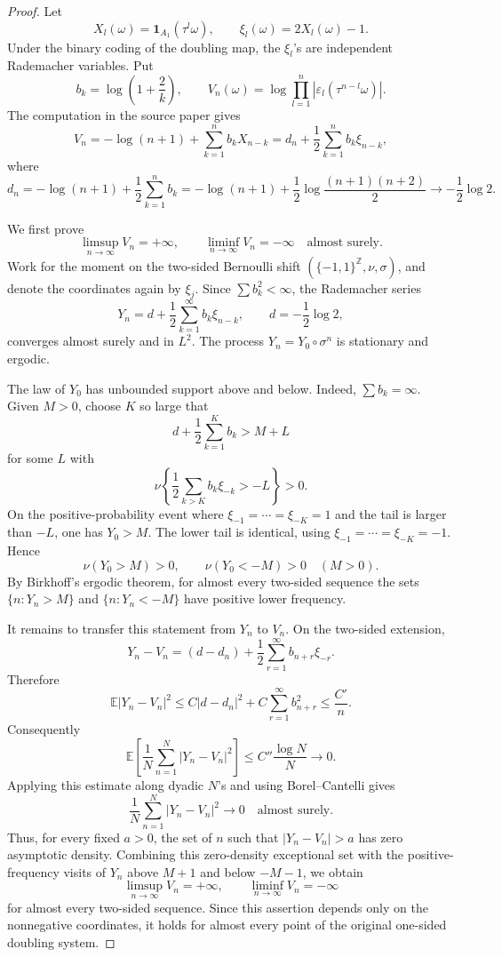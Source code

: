 \documentclass[11pt]{article}
\newcommand{\E}{\mathbb E}
\newcommand{\one}{\mathbf 1}
\begin{document}
\begin{proof}
Let
\[
  X_l(\omega)=\one_{A_1}(\tau^l\omega), \qquad
  \xi_l(\omega)=2X_l(\omega)-1 .
\]
Under the binary coding of the doubling map, the \(\xi_l\)'s are independent
Rademacher variables.  Put
\[
  b_k=\log\left(1+\frac2k\right), \qquad
  V_n(\omega)=
  \log\prod_{l=1}^{n}
  \left|\varepsilon_l(\tau^{n-l}\omega)\right|.
\]
The computation in the source paper gives
\[
  V_n
  =
  -\log(n+1)+\sum_{k=1}^{n} b_k X_{n-k}
  =
  d_n+\frac12\sum_{k=1}^{n} b_k \xi_{n-k},
\]
where
\[
  d_n=-\log(n+1)+\frac12\sum_{k=1}^{n} b_k
      =-\log(n+1)+\frac12\log\frac{(n+1)(n+2)}2
      \longrightarrow -\frac12\log 2 .
\]

We first prove
\[
  \limsup_{n\to\infty} V_n=+\infty,
  \qquad
  \liminf_{n\to\infty} V_n=-\infty
  \quad\text{almost surely.}
\]
Work for the moment on the two-sided Bernoulli shift
\((\{-1,1\}^{\mathbb Z},\nu,\sigma)\), and denote the coordinates again by
\(\xi_j\).  Since \(\sum b_k^2<\infty\), the Rademacher series
\[
  Y_n=d+\frac12\sum_{k=1}^{\infty} b_k \xi_{n-k},
  \qquad d=-\frac12\log2,
\]
converges almost surely and in \(L^2\).  The process \(Y_n=Y_0\circ\sigma^n\)
is stationary and ergodic.

The law of \(Y_0\) has unbounded support above and below.  Indeed,
\(\sum b_k=\infty\).  Given \(M>0\), choose \(K\) so large that
\[
  d+\frac12\sum_{k=1}^{K}b_k > M+L
\]
for some \(L\) with
\[
  \nu\left\{\frac12\sum_{k>K}b_k\xi_{-k}>-L\right\}>0.
\]
On the positive-probability event where
\(\xi_{-1}=\cdots=\xi_{-K}=1\) and the tail is larger than \(-L\), one has
\(Y_0>M\).  The lower tail is identical, using
\(\xi_{-1}=\cdots=\xi_{-K}=-1\).  Hence
\[
  \nu(Y_0>M)>0,\qquad \nu(Y_0<-M)>0
  \quad (M>0).
\]
By Birkhoff's ergodic theorem, for almost every two-sided sequence the sets
\(\{n:Y_n>M\}\) and \(\{n:Y_n<-M\}\) have positive lower frequency.

It remains to transfer this statement from \(Y_n\) to \(V_n\).  On the
two-sided extension,
\[
  Y_n-V_n
  =
  (d-d_n)+\frac12\sum_{r=1}^{\infty}b_{n+r}\xi_{-r}.
\]
Therefore
\[
  \E |Y_n-V_n|^2
  \le C|d-d_n|^2+C\sum_{r=1}^{\infty}b_{n+r}^2
  \le \frac{C'}{n}.
\]
Consequently
\[
  \E\left[\frac1N\sum_{n=1}^{N}|Y_n-V_n|^2\right]
  \le C''\frac{\log N}{N}\longrightarrow0.
\]
Applying this estimate along dyadic \(N\)'s and using Borel--Cantelli gives
\[
  \frac1N\sum_{n=1}^{N}|Y_n-V_n|^2\longrightarrow0
  \quad\text{almost surely}.
\]
Thus, for every fixed \(a>0\), the set of \(n\) such that
\(|Y_n-V_n|>a\) has zero asymptotic density.  Combining this zero-density
exceptional set with the positive-frequency visits of \(Y_n\) above \(M+1\)
and below \(-M-1\), we obtain
\[
  \limsup_{n\to\infty}V_n=+\infty,
  \qquad
  \liminf_{n\to\infty}V_n=-\infty
\]
for almost every two-sided sequence.  Since this assertion depends only on
the nonnegative coordinates, it holds for almost every point of the original
one-sided doubling system.


\end{proof}
\end{document}
